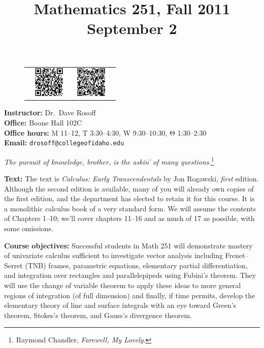 \documentclass[10pt]{amsart}
\title{{\Large Mathematics 251, Fall 2011 \\ September 2}}
\begin{document}
\maketitle
\thispagestyle{empty}

\begin{figure}
    \begin{tabular}{ccccc} %
	   \hspace*{-5mm} & \includegraphics[height=55px]{qr-facpage.png} & \hspace*{0mm} &
        \includegraphics[height=55px]{qr-homework.png} & \hfill
    \end{tabular}
\end{figure}

\textbf{Instructor:} Dr.\ Dave Rosoff  \\
\textbf{Office:} Boone Hall 102C \\
\textbf{Office hours:} M 11--12, T 3:30--4:30, W 9:30--10:30, $\mathrm{\Theta}$ 1:30--2:30 \hspace*{0.25in}\\
\textbf{Email:} \verb[drosoff@collegeofidaho.edu[ 
\begin{center}

{\large \emph{The pursuit of knowledge, brother, is the askin' of many questions.}\footnote{Raymond Chandler, \emph{Farewell, My Lovely}.}}

\end{center}
\textbf{Text:} The text is \emph{Calculus: Early Transcendentals} by Jon Rogawski, \emph{first} edition. Although the second edition is available, many of you will already own copies of the first edition, and the department has elected to retain it for this course. It is a monolithic calculus book of a very standard form. We will assume the contents of Chapters 1--10; we'll cover chapters 11--16 and as much of 17 as possible, with some omissions.

\textbf{Course objectives:} Successful students in Math 251 will demonstrate mastery of univariate calculus sufficient to investigate vector analysis including Frenet--Serret (TNB) frames, parametric equations, elementary partial differentiation, and integration over rectangles and parallelepipeds using Fubini's theorem. They will use the change of variable theorem to apply these ideas to more general regions of integration (of full dimension) and finally, if time permits, develop the elementary theory of line and surface integrals with an eye toward Green's theorem, Stokes's theorem, and Gauss's divergence theorem.
\end{document}
